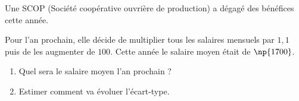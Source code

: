 \begin{exo}
	Une SCOP (Société coopérative ouvrière de production) a dégagé des bénéfices cette année.

	Pour l'an prochain, elle décide de multiplier tous les salaires mensuels par $1,1$ puis de les augmenter de $100$\eur. Cette année le salaire moyen était de $\np{1700}$\eur.

	\begin{enumerate}
		\item Quel sera le salaire moyen l'an prochain ?
		\item Estimer comment va évoluer l'écart-type.
	\end{enumerate}
\end{exo}
